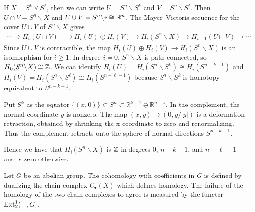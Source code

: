 \documentclass[12pt]{article}
\begin{document}
\begin{solution}
    If $X = S^k \vee S^\ell$, then we can write $U = S^n \backslash S^k$ and $V = S^n \backslash S^\ell$. Then $U\cap V = S^n \backslash X$ and $U\cup V = S^n \backslash * \cong \mathbb{R}^n$. The Mayer--Vietoris sequence for the cover $U\cup V$ of $S^n \backslash X$ gives
    \begin{align*}
        \cdots \to H_i(U\cap V) & \to H_i(U)\oplus H_i(V) \to H_i(S^n \backslash X) \to H_{i-1}(U\cap V) \to \cdots
    \end{align*}
    Since $U\cup V$ is contractible, the map $H_i(U)\oplus H_i(V) \to H_i(S^n \backslash X)$ is an isomorphism for $i\ge 1$. In degree $i=0$, $S^n \backslash X$ is path connected, so $H_0(S^n \backslash X)\cong \mathbb{Z}$. We can identify $H_i(U) = H_i(S^n \backslash S^k) \cong H_i(S^{n-k-1})$ and $H_i(V) = H_i(S^n \backslash S^\ell) \cong H_i(S^{n-\ell-1})$ because $S^n \backslash S^k$ is homotopy equivalent to $S^{n-k-1}$.

    Put $S^k$ as the equator $\{(x,0)\}\subset S^n\subset \mathbb R^{k+1}\oplus \mathbb R^{n-k}$. In the complement, the normal coordinate $y$ is nonzero. The map $(x,y)\mapsto (0,y/|y|)$ is a deformation retraction, obtained by shrinking the x-coordinate to zero and renormalizing. Thus the complement retracts onto the sphere of normal directions $S^{n-k-1}$.

     Hence we have that $H_i(S^n \backslash X)$ is $\mathbb{Z}$ in degrees $0$, $n-k-1$, and $n-\ell-1$, and is zero otherwise.
\end{solution}

Let $G$ be an abelian group. The cohomology with coefficients in $G$ is defined by dualizing the chain complex $C_\bullet(X)$ which defines homology. The failure of the homology of the two chain complexes to agree is measured by the functor $\operatorname{Ext}^1_{\mathbb{Z}}(-,G)$.
\end{document}
